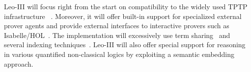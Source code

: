 \documentclass[twocolumn,a4paper,10pt]{article}
\begin{document}
\noindent Leo-III will focus right from the start on compatibility to the widely used TPTP infrastructure
~\cite{Sutcliffe:2009:TPL:1666192.1666217}. Moreover, it will offer built-in support for specialized
external prover agents and provide external interfaces to  interactive provers such as Isabelle/HOL~\cite{nipkow2002isabelle}.
The implementation will excessively use term sharing~\cite{Riazanov:2002:DIV:1218615.1218620,Schulz:2002:EBT:1218615.1218621}
and several indexing techniques~\cite{Nieuwenhuis03onthe, W35}.
Leo-III will also offer special support for reasoning in various quantified non-classical
logics by exploiting a semantic embedding~\cite{C35} approach.




\end{document}
